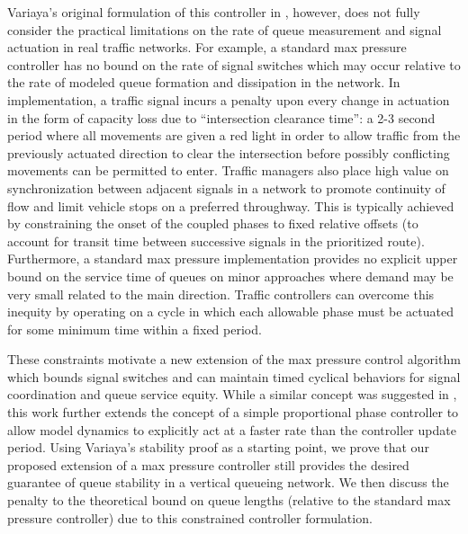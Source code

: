 Variaya's original formulation of this controller in \cite{MaxPressureStochastic}, however, does not fully consider the practical limitations on the rate of queue measurement and signal actuation in real traffic networks. For example, a standard max pressure controller has no bound on the rate of signal switches which may occur relative to the rate of modeled queue formation and dissipation in the network. In implementation, a traffic signal incurs a penalty upon every change in actuation in the form of capacity loss due to ``intersection clearance time'': a 2-3 second period where all movements are given a red light in order to allow traffic from the previously actuated direction to clear the intersection before possibly conflicting movements can be permitted to enter. Traffic managers also place high value on synchronization between adjacent signals in a network to promote continuity of flow and limit vehicle stops on a preferred throughway. This is typically achieved by constraining the onset of the coupled phases to fixed relative offsets (to account for transit time between successive signals in the prioritized route). Furthermore, a standard max pressure implementation provides no explicit upper bound on the service time of queues on minor approaches where demand may be very small related to the main direction. Traffic controllers can overcome this inequity by operating on a cycle in which each allowable phase must be actuated for some minimum time within a fixed period.

These constraints motivate a new extension of the max pressure control algorithm which bounds signal switches and can maintain timed cyclical behaviors for signal coordination and queue service equity. While a similar concept was suggested in \cite{MaxPressureStochastic}, this work further extends the concept of a simple proportional phase controller to allow model dynamics to explicitly act at a faster rate than the controller update period. Using Variaya's stability proof as a starting point, we prove that our proposed extension of a max pressure controller still provides the desired guarantee of queue stability in a vertical queueing network. We then discuss the penalty to the theoretical bound on queue lengths (relative to the standard max pressure controller) due to this constrained controller formulation. 

